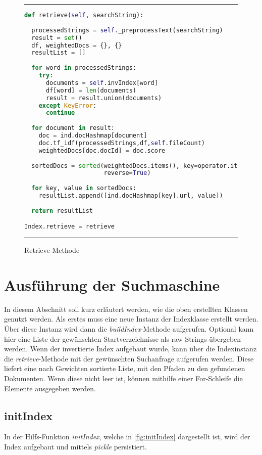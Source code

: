 \begin{figure}
	\rule{\textwidth}{0.4pt}
		\begin{lstlisting}[language=Python]
def retrieve(self, searchString):
 
  processedStrings = self._preprocessText(searchString)
  result = set()
  df, weightedDocs = {}, {}
  resultList = []
    
  for word in processedStrings:
    try:
      documents = self.invIndex[word]
      df[word] = len(documents)
      result = result.union(documents)
    except KeyError:
      continue
    
  for document in result:
    doc = ind.docHashmap[document]
    doc.tf_idf(processedStrings,df,self.fileCount)
    weightedDocs[doc.docId] = doc.score
        
  sortedDocs = sorted(weightedDocs.items(), key=operator.itemgetter(1),
                      reverse=True)
    
  for key, value in sortedDocs:
    resultList.append([ind.docHashmap[key].url, value])
        
  return resultList

Index.retrieve = retrieve
		\end{lstlisting}
	\rule{\textwidth}{0.4pt}
	\caption{Retrieve-Methode}
	\label{fig:retrieve}
\end{figure}

\section{Ausführung der Suchmaschine}
In diesem Abschnitt soll kurz erläutert werden, wie die oben erstellten Klassen genutzt werden. Als erstes muss eine neue Instanz der Indexklasse erstellt werden. Über diese Instanz wird dann die \textit{buildIndex}-Methode aufgerufen. Optional kann hier eine Liste der gewünschten Startverzeichnisse als raw Strings übergeben werden. Wenn der invertierte Index aufgebaut wurde, kann über die Indexinstanz die \textit{retrieve}-Methode mit der gewünschten Suchanfrage aufgerufen werden. Diese liefert eine nach Gewichten sortierte Liste, mit den Pfaden zu den gefundenen Dokumenten. Wenn diese nicht leer ist, können mithilfe einer For-Schleife die Elemente ausgegeben werden.

\subsection{initIndex}\label{initIndex}
In der Hilfs-Funktion \textit{initIndex}, welche in \ref{fig:initIndex} dargestellt ist, wird der Index aufgebaut und mittels \textit{pickle} persistiert.

